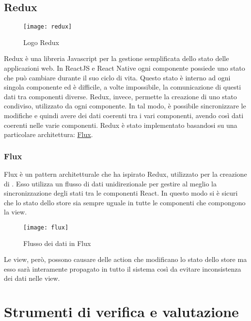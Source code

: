 \subsection{Redux}
\begin{figure}[H] 
	\centering
	\texttt{[image: redux]}
	\caption{Logo Redux}
\end{figure}
Redux è una libreria Javascript per la gestione semplificata dello stato delle applicazioni web. In ReactJS e React Native ogni componente possiede uno stato che può cambiare durante il suo ciclo di vita. Questo stato è interno ad ogni singola componente ed è difficile, a volte impossibile, la comunicazione di questi dati tra componenti diverse.
Redux, invece, permette la creazione di uno stato condiviso, utilizzato da ogni
componente. In tal modo, è possibile sincronizzare le modifiche e quindi avere
dei dati coerenti  tra i vari componenti, avendo così dati coerenti nelle varie
componenti.
Redux è stato implementato basandosi su una particolare architettura:
\hyperref[subsubsec:flux]{Flux}.

\subsubsection{Flux}\label{subsubsec:flux}
 Flux è un pattern architetturale che ha ispirato Redux, utilizzato per la creazione di . Esso utilizza un flusso di dati unidirezionale per gestire al meglio la sincronizzazione degli stati tra le componenti React. In questo modo si è sicuri che lo stato dello store sia sempre uguale in tutte le componenti che compongono la view.
 \begin{figure}[H] 
 	\centering
 	\texttt{[image: flux]}
 	\caption{Flusso dei dati in Flux}
 \end{figure}
Le view, però, possono causare delle action che modificano lo stato dello store ma esso sarà interamente propagato in tutto il sistema così da evitare inconsistenza dei dati nelle view.

\section{Strumenti di verifica e valutazione}

